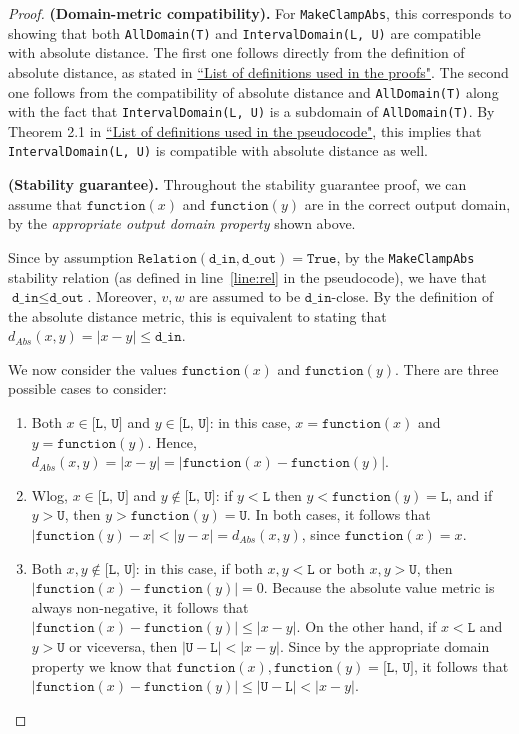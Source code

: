 \documentclass[11pt,a4paper]{article}
\theoremstyle{definition}
\newcommand{\din}{\texttt{d\_in}}
\newcommand{\dout}{\texttt{d\_out}}
\newcommand{\Relation}{\texttt{Relation}}
\newcommand{\True}{\texttt{True}}
\newcommand{\function}{\texttt{function}}
\newcommand{\silvia}[1]{{ {\color{blue}{(silvia)~#1}}}}
\begin{document}
\begin{proof}
\smallskip
\textbf{(Domain-metric compatibility).}  For \texttt{MakeClampAbs}, this corresponds to showing that both \texttt{AllDomain(T)} and \texttt{IntervalDomain(L, U)} are compatible with absolute distance. The first one follows directly from the definition of absolute distance, as stated in \href{https://www.overleaf.com/project/60d214e390b337703d200982}{``List of definitions used in the proofs"}. The second one follows from the compatibility of absolute distance and \texttt{AllDomain(T)} along with the fact that \texttt{IntervalDomain(L, U)} is a subdomain of \texttt{AllDomain(T)}. By Theorem 2.1 in \href{https://www.overleaf.com/project/60d215bf90b337ac02200a99}{``List of definitions used in the pseudocode"}, this implies that \texttt{IntervalDomain(L, U)} is compatible with absolute distance as well. 
    
\silvia{Flag: this is an example of the subdomain issues that we have been discussing during the week of July 19. Hence this paragraph might need some phrasing updates when the compatibility pairing constructor and the subdomain trait are implemented.}

\smallskip
\textbf{(Stability guarantee).} Throughout the stability guarantee proof, we can assume that $\function(x)$ and $\function(y)$ are in the correct output domain, by the \textit{appropriate output domain property} shown above. 

Since by assumption $\Relation(\din, \dout) = \True$, by the \texttt{MakeClampAbs} stability relation (as defined in line~\ref{line:rel} in the pseudocode), we have that $\din \leq \dout$. Moreover, $v, w$ are assumed to be $\din$-close. By the definition of the absolute distance metric, this is equivalent to stating that $d_{Abs}(x, y) = |x - y| \leq \din$.

We now consider the values $\function(x)$ and $\function(y)$. There are three possible cases to consider:
\begin{enumerate}
    \item Both $x \in \texttt{[L, U]}$ and $y \in \texttt{[L, U]}$: in this case, $x = \function(x)$ and $y = \function(y)$. Hence, $d_{Abs}(x, y) = |x-y| = |\function(x) - \function(y)|$.
    \item Wlog, $x \in \texttt{[L, U]}$ and $y \notin \texttt{[L, U]}$: if $y < \texttt{L}$ then $y < \function(y) = \texttt{L}$, and if $y > \texttt{U}$, then $y > \function(y) = \texttt{U}$. In both cases, it follows that $|\function(y) - x| < |y - x| = d_{Abs}(x, y)$, since $\function(x) = x$.
    \item Both $x, y \notin \texttt{[L, U]}$: in this case, if both $x, y < \texttt{L}$ or both $x, y > \texttt{U}$, then $|\function(x) - \function(y)| = 0$. Because the absolute value metric is always non-negative, it follows that $|\function(x) - \function(y)| \leq |x - y|$. On the other hand, if $x < \texttt{L}$ and $y > \texttt{U}$ or viceversa, then $|\texttt{U}-\texttt{L}| < |x-y|$. Since by the appropriate domain property we know that $\function(x), \function(y) = \texttt{[L, U]}$, it follows that $|\function(x) - \function(y)| \leq |\texttt{U}-\texttt{L}| < |x-y|$.
\end{enumerate}


\end{proof}
\end{document}
